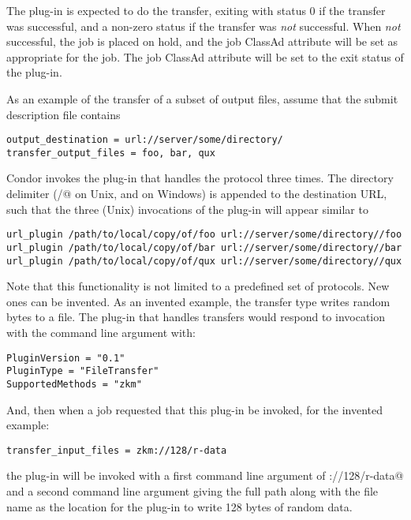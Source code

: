 The plug-in is expected to do the transfer,
exiting with status 0 if the transfer was successful, 
and a non-zero status if the transfer was \emph{not} successful.
When \emph{not} successful, the job is placed on hold,
and the job ClassAd attribute  will be set as
appropriate for the job.
The job ClassAd attribute  will be set to
the exit status of the plug-in.

As an example of the transfer of a subset of output files,
assume that the submit description file contains 
\footnotesize
\begin{verbatim}
output_destination = url://server/some/directory/
transfer_output_files = foo, bar, qux
\end{verbatim}
\normalsize
Condor invokes the plug-in that handles the  protocol
three times.
The directory delimiter
(\verb@/@ on Unix, and \verb@\@ on Windows) 
is appended to the destination URL,
such that the three (Unix) invocations of the plug-in will appear similar to
\footnotesize
\begin{verbatim}
url_plugin /path/to/local/copy/of/foo url://server/some/directory//foo
url_plugin /path/to/local/copy/of/bar url://server/some/directory//bar
url_plugin /path/to/local/copy/of/qux url://server/some/directory//qux
\end{verbatim}
\normalsize

Note that this functionality is not limited to a predefined set
of protocols.
New ones can be invented.
As an invented example,
the \verb@zkm@ transfer type writes random bytes to a file.
The plug-in that handles \verb@zkm@ transfers would respond to 
invocation with the  command line argument with:
\footnotesize
\begin{verbatim}
PluginVersion = "0.1"
PluginType = "FileTransfer"
SupportedMethods = "zkm"
\end{verbatim}
\normalsize
And, then when a job requested that this plug-in be invoked,
for the invented example:
\footnotesize
\begin{verbatim}
transfer_input_files = zkm://128/r-data
\end{verbatim}
\normalsize
the plug-in will be invoked with a first command line argument
of \verb@zkm://128/r-data@ and a second command line argument giving
the full path along with the file name  as the location
for the plug-in to write 128 bytes of random data.

